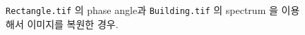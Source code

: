 \documentclass[a4paper, 12p]{paper}
\def\code#1{\texttt{#1}}
\begin{document}
\begin{figure}[H]
\centering
{}
\caption{\code{Rectangle.tif} 의 phase angle과 \code{Building.tif} 의 spectrum 을 이용해서 이미지를 복원한 경우.}\label{fig:impl1_2}
\end{figure}
\end{document}
